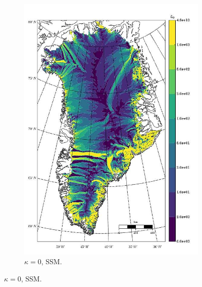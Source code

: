 \begin{figure}
\begin{subfigure}[b]{0.25\linewidth}
    \includegraphics[width=\linewidth]{images/balance_velocity/greenland/d_U_ob/Ubar_5H_kappa_0_SSM.jpg}
  \caption{$\kappa = 0$, SSM.}
  \label{greenland_bv_image_d_U_ob_kappa_5_SSM}
  \end{subfigure}


\end{figure}
